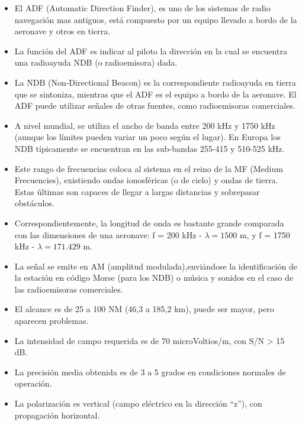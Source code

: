 \begin{itemize}
\item El ADF (Automatic Direction Finder), es uno de los sistemas de
  radio navegación mas antiguos, est\'a compuesto por un equipo
  llevado a bordo de la aeronave y otros en tierra.

\item   La funci\'on del ADF es indicar al piloto la direcci\'on en la cual
  se encuentra una radioayuda NDB (o radioemisora) dada.

\item   La NDB (Non-Directional Beacon) es la correspondiente radioayuda en
  tierra que se sintoniza, mientras que el ADF es el equipo a bordo de
  la aeronave. El ADF puede utilizar se\~nales de otras fuentes, como
  radioemisoras comerciales.

\item   A nivel mundial, se utiliza el ancho de banda entre 200 kHz y 1750
  kHz (aunque los l\'imites pueden variar un poco seg\'un el
  lugar). En Europa los NDB t\'ipicamente se encuentran en las
  sub-bandas 255-415 y 510-525 kHz.

\item   Este rango de frecuencias coloca al sistema en el reino de la MF
  (Medium Frecuencies), existiendo ondas ionosf\'ericas (o de cielo) y
  ondas de tierra. Estas \'ultimas son capaces de llegar a largas
  distancias y sobrepasar obst\'aculos.

\item   Correspondientemente, la longitud de onda es bastante grande
  comparada con las dimensiones de una aeronave: f = 200 kHz -
  $\lambda = 1500$ m, y f = 1750 kHz - $\lambda = 171.429$ m.

\item   La se\~nal se emite en AM (amplitud modulada),envi\'andose la
  identificaci\'on de la estaci\'on en c\'odigo Morse (para los NDB) o
  m\'usica y sonidos en el caso de las radioemisoras comerciales.

\item   El alcance es de 25 a 100 NM (46,3 a 185,2 km), puede ser mayor,
  pero aparecen problemas.

\item   La intensidad de campo requerida es de 70 microVoltios/m, con S/N >
  15 dB.

\item   La precisi\'on media obtenida es de 3 a 5 grados en condiciones
  normales de operaci\'on.

\item   La polarizaci\'on es vertical (campo el\'ectrico en la direcci\'on
  ``z''), con propagaci\'on horizontal.
\end{itemize}


